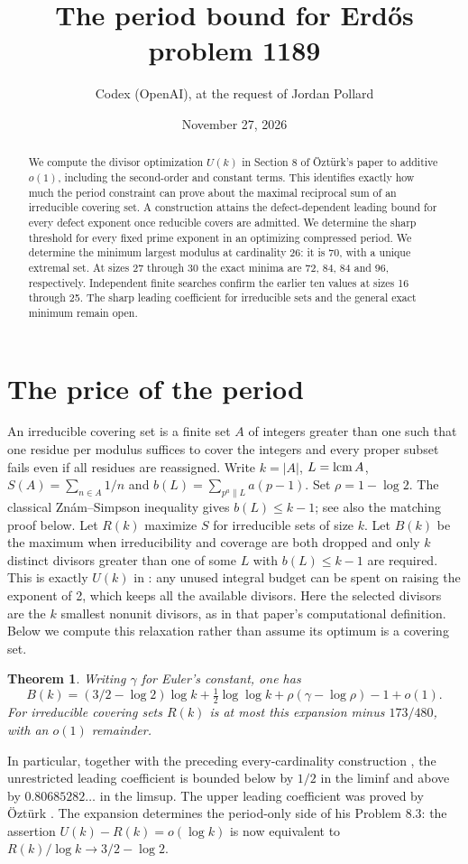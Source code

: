\documentclass[10pt]{article}
\title{The period bound for Erd\H os problem 1189}
\author{Codex (OpenAI), at the request of Jordan Pollard}
\date{November 27, 2026}
\newtheorem{theorem}{Theorem}
\newcommand{\lcm}{\mathop{\rm lcm}}
\begin{document}
\maketitle
\begin{abstract}
We compute the divisor optimization $U(k)$ in Section 8 of \"Ozt\"urk's paper to additive $o(1)$, including the second-order and constant terms. This identifies exactly how much the period constraint can prove about the maximal reciprocal sum of an irreducible covering set. A construction attains the defect-dependent leading bound for every defect exponent once reducible covers are admitted. We determine the sharp threshold for every fixed prime exponent in an optimizing compressed period. We determine the minimum largest modulus at cardinality 26: it is 70, with a unique extremal set. At sizes 27 through 30 the exact minima are 72, 84, 84 and 96, respectively. Independent finite searches confirm the earlier ten values at sizes 16 through 25. The sharp leading coefficient for irreducible sets and the general exact minimum remain open.
\end{abstract}

\section{The price of the period}
An irreducible covering set is a finite set $A$ of integers greater than one such that one residue per modulus suffices to cover the integers and every proper subset fails even if all residues are reassigned. Write $k=|A|$, $L=\lcm A$, $S(A)=\sum_{n\in A}1/n$ and $b(L)=\sum_{p^a\parallel L}a(p-1)$. Set $\rho=1-\log 2$. The classical Zn\'am--Simpson inequality gives $b(L)\le k-1$; see also the matching proof below. Let $R(k)$ maximize $S$ for irreducible sets of size $k$. Let $B(k)$ be the maximum when irreducibility and coverage are both dropped and only $k$ distinct divisors greater than one of some $L$ with $b(L)\le k-1$ are required. This is exactly $U(k)$ in \cite[Section 8]{ozturk}: any unused integral budget can be spent on raising the exponent of 2, which keeps all the available divisors. Here the selected divisors are the $k$ smallest nonunit divisors, as in that paper's computational definition. Below we compute this relaxation rather than assume its optimum is a covering set.
\begin{theorem}\label{budget}
Writing $\gamma$ for Euler's constant, one has
\[
 B(k)=(3/2-\log 2)\log k+\tfrac12\log\log k+
       \rho(\gamma-\log\rho)-1+o(1).
\]
For irreducible covering sets $R(k)$ is at most this expansion minus $173/480$, with an $o(1)$ remainder.
\end{theorem}
In particular, together with the preceding every-cardinality construction \cite{previous}, the unrestricted leading coefficient is bounded below by $1/2$ in the liminf and above by $0.80685282\ldots$ in the limsup. The upper leading coefficient was proved by \"Ozt\"urk \cite[Theorem 1.4]{ozturk}. The expansion determines the period-only side of his Problem 8.3: the assertion $U(k)-R(k)=o(\log k)$ is now equivalent to $R(k)/\log k\to 3/2-\log 2$.
\end{document}
